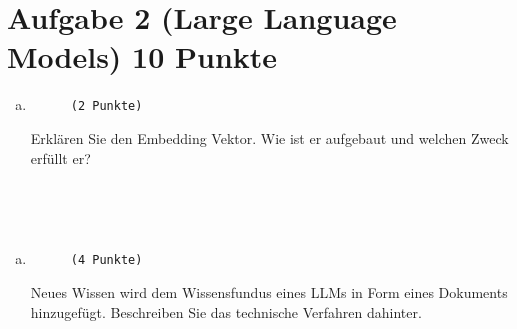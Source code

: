 \documentclass[12pt, ngerman]{AssignmentClass}
\begin{document}
\section*{Aufgabe 2 (Large Language Models) \hfill 10 Punkte}

    \begin{enumerate}[a)]
		\item 
			\begin{minipage}[t]{\linewidth}
				\vspace{-0.61em}
				\begin{figure} 
					\raggedleft
					\texttt{(2 Punkte)}
				\end{figure}
                Erklären Sie den Embedding Vektor. Wie ist er aufgebaut und welchen Zweck erfüllt er?
			\end{minipage}
	\end{enumerate}
 
	\begin{solution}
		\noindent
		\\
	\end{solution}

    \begin{answerbox}
		\noindent
		\fbox{\parbox[c]{\textwidth}{
				\vspace{5cm}
				\hspace{\textwidth}
		}}\\
	\end{answerbox}

    \begin{enumerate}[b)]
		\item 
			\begin{minipage}[t]{\linewidth}
				\vspace{-0.61em}
				\begin{figure} 
					\raggedleft
					\texttt{(4 Punkte)}
				\end{figure}
                Neues Wissen wird dem Wissensfundus eines LLMs in Form eines Dokuments hinzugefügt. Beschreiben Sie das technische Verfahren dahinter.
			\end{minipage}
	\end{enumerate}
 
\end{document}
